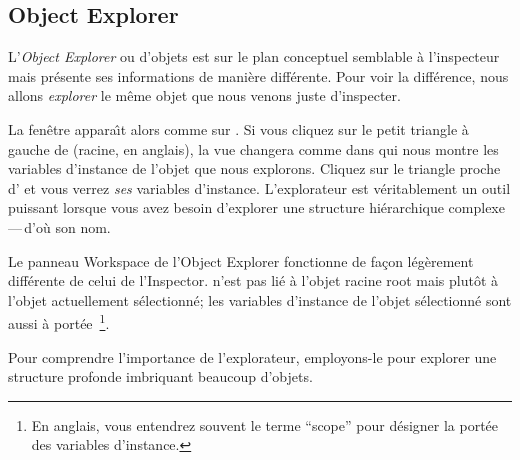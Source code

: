\documentclass[a4paper,10pt,twoside]{book}
\begin{document}
\subsection{Object Explorer}

L'\emph{Object Explorer} ou  d'objets est sur le plan conceptuel semblable \`a l'inspecteur mais pr\'esente ses informations de mani\`ere diff\'erente.
Pour voir la diff\'erence, nous allons \emph{explorer} le m\^eme objet
que nous venons juste d'inspecter.

La fen\^etre  appara\^{\i}t alors comme sur
 .
Si vous cliquez sur le petit triangle \`a gauche de  (racine, en anglais), la vue changera comme dans  qui
nous montre les variables d'instance de l'objet que nous explorons.
Cliquez sur le triangle proche d' et vous verrez
\emph{ses} variables d'instance.
L'explorateur est v\'eritablement un outil puissant lorsque vous avez besoin
d'explorer une structure hi\'erarchique complexe\,---\,d'o\`u son nom.

Le panneau Workspace de l'Object Explorer fonctionne de fa\c{c}on
 l\'eg\`erement diff\'erente de celui de l'Inspector.
 n'est pas li\'e \`a l'objet racine root mais plut\^ot
\`a l'objet actuellement s\'electionn\'e; les variables d'instance de
l'objet s\'electionn\'e sont aussi \`a port\'ee~\footnote{En anglais, vous
entendrez souvent le terme ``scope'' pour d\'esigner la port\'ee des
variables d'instance.}.

Pour comprendre l'importance de l'explorateur, employons-le pour
explorer une structure profonde imbriquant beaucoup d'objets.

\end{document}
